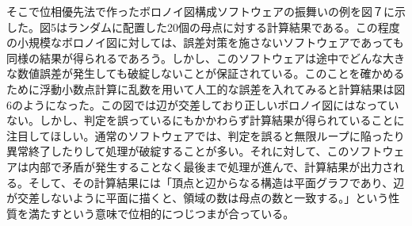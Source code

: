 \documentclass[../main]{jsarticle}
\begin{document}
そこで位相優先法で作ったボロノイ図構成ソフトウェアの振舞いの例を図７に示した。図5はランダムに配置した20個の母点に対する計算結果である。この程度の小規模なボロノイ図に対しては、誤差対策を施さないソフトウェアであっても同様の結果が得られるであろう。しかし、このソフトウェアは途中でどんな大きな数値誤差が発生しても破綻しないことが保証されている。このことを確かめるために浮動小数点計算に乱数を用いて人工的な誤差を入れてみると計算結果は図6のようになった\cite{1}。この図では辺が交差しており正しいボロノイ図にはなっていない。しかし、判定を誤っているにもかかわらず計算結果が得られていることに注目してほしい。通常のソフトウェアでは、判定を誤ると無限ループに陥ったり異常終了したりして処理が破綻することが多い。それに対して、このソフトウェアは内部で矛盾が発生することなく最後まで処理が進んで、計算結果が出力される。そして、その計算結果には「頂点と辺からなる構造は平面グラフであり、辺が交差しないように平面に描くと、領域の数は母点の数と一致する。」という性質を満たすという意味で位相的につじつまが合っている。
\end{document}
